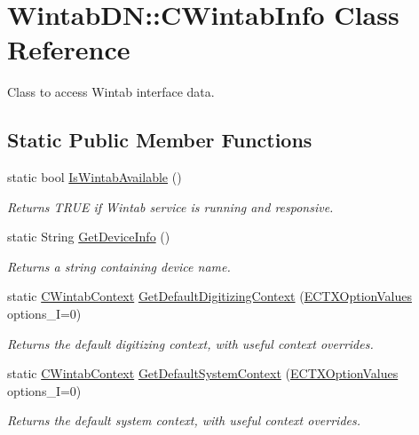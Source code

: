 \hypertarget{class_wintab_d_n_1_1_c_wintab_info}{
\section{WintabDN::CWintabInfo Class Reference}
\label{class_wintab_d_n_1_1_c_wintab_info}
}


Class to access Wintab interface data.  


\subsection*{Static Public Member Functions}
\begin{DoxyCompactItemize}
\item 
static bool \hyperlink{class_wintab_d_n_1_1_c_wintab_info_ab8bd2f68a94355ffecd3de6519b186e6}{IsWintabAvailable} ()
\begin{DoxyCompactList}\small\item\em Returns TRUE if Wintab service is running and responsive. \item\end{DoxyCompactList}\item 
static String \hyperlink{class_wintab_d_n_1_1_c_wintab_info_acf649a900e2cfa4f439b7f1b5d1a5f81}{GetDeviceInfo} ()
\begin{DoxyCompactList}\small\item\em Returns a string containing device name. \item\end{DoxyCompactList}\item 
static \hyperlink{class_wintab_d_n_1_1_c_wintab_context}{CWintabContext} \hyperlink{class_wintab_d_n_1_1_c_wintab_info_a52434513444ad6db7e7e01ec6c771b88}{GetDefaultDigitizingContext} (\hyperlink{namespace_wintab_d_n_a701e8021b6889039ed562596a2d1bdd2}{ECTXOptionValues} options\_\-I=0)
\begin{DoxyCompactList}\small\item\em Returns the default digitizing context, with useful context overrides. \item\end{DoxyCompactList}\item 
static \hyperlink{class_wintab_d_n_1_1_c_wintab_context}{CWintabContext} \hyperlink{class_wintab_d_n_1_1_c_wintab_info_a6b08041129180d63b1789246f93dca81}{GetDefaultSystemContext} (\hyperlink{namespace_wintab_d_n_a701e8021b6889039ed562596a2d1bdd2}{ECTXOptionValues} options\_\-I=0)
\begin{DoxyCompactList}\small\item\em Returns the default system context, with useful context overrides. \item\end{DoxyCompactList}\item 

\end{DoxyCompactItemize}
